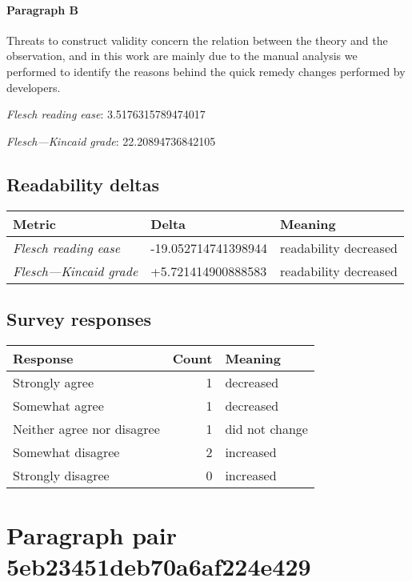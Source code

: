 \paragraph{Paragraph B}
Threats to construct validity concern the relation between the theory and the observation, and in this work are mainly due to the manual analysis we performed to identify the reasons behind the quick remedy changes performed by developers.\par\medskip\emph{Flesch reading ease}: 3.5176315789474017\par\emph{Flesch---Kincaid grade}: 22.20894736842105

\subsection{Readability deltas}

\begin{tabular}{lll}
\toprule
               \textbf{Metric} &       \textbf{Delta} &       \textbf{Meaning} \\
\midrule
    \emph{Flesch reading ease} &  -19.052714741398944 &  readability decreased \\
 \emph{Flesch---Kincaid grade} &   +5.721414900888583 &  readability decreased \\
\bottomrule
\end{tabular}

\subsection{Survey responses}
\begin{tabular}{lrl}
\toprule
          \textbf{Response} &  \textbf{Count} & \textbf{Meaning} \\
\midrule
             Strongly agree &               1 &        decreased \\
             Somewhat agree &               1 &        decreased \\
 Neither agree nor disagree &               1 &   did not change \\
          Somewhat disagree &               2 &        increased \\
          Strongly disagree &               0 &        increased \\
\bottomrule
\end{tabular}

\section{Paragraph pair 5eb23451deb70a6af224e429}
